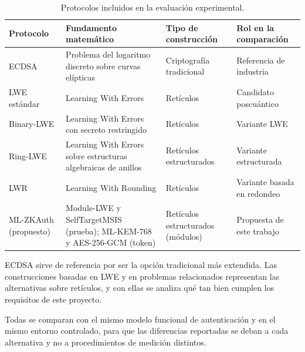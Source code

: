 \begin{table}[H]
\centering
\caption{Protocolos incluidos en la evaluación experimental.}
\label{tab:protocol-summary}
\small
\begin{tabularx}{\textwidth}{lYYY}
\toprule
\textbf{Protocolo} &
\textbf{Fundamento matemático} &
\textbf{Tipo de construcción} &
\textbf{Rol en la comparación} \\
\midrule

ECDSA &
Problema del logaritmo discreto sobre curvas elípticas &
Criptografía tradicional &
Referencia de industria \\

LWE estándar &
Learning With Errors &
Retículos &
Candidato poscuántico \\

Binary-LWE &
Learning With Errors con secreto restringido &
Retículos &
Variante LWE \\

Ring-LWE &
Learning With Errors sobre estructuras algebraicas de anillos &
Retículos estructurados &
Variante estructurada \\

LWR &
Learning With Rounding &
Retículos &
Variante basada en redondeo \\

ML-ZKAuth (propuesto) &
Module-LWE y SelfTargetMSIS (prueba); ML-KEM-768 y AES-256-GCM (token) &
Retículos estructurados (módulos) &
Propuesta de este trabajo \\

\bottomrule
\end{tabularx}
\end{table}

ECDSA sirve de referencia por ser la opción tradicional más extendida. 
Las construcciones basadas en LWE y en problemas relacionados representan las alternativas sobre retículos, 
y con ellas se analiza qué tan bien cumplen los requisitos de este proyecto.

Todas se comparan con el mismo modelo funcional de autenticación y en el mismo entorno controlado, 
para que las diferencias reportadas se deban a cada alternativa y no a procedimientos de medición distintos.